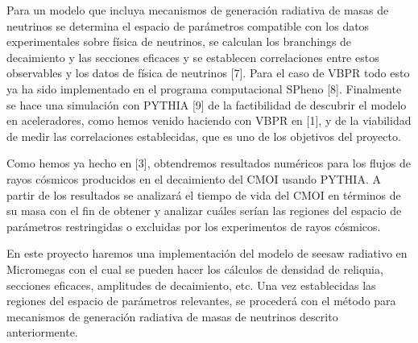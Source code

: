 \begin{ideas}
  

Para un modelo que incluya mecanismos de generación radiativa de masas de neutrinos se determina el espacio de parámetros compatible con los datos experimentales sobre física de neutrinos, se calculan los branchings de decaimiento y las secciones eficaces y se establecen correlaciones entre estos observables y los datos de física de neutrinos [7]. Para el caso de VBPR todo esto ya ha sido implementado en el programa computacional SPheno [8]. Finalmente se hace una simulación con PYTHIA [9] de la factibilidad de descubrir el modelo en aceleradores, como hemos venido haciendo con VBPR en [1], y de la viabilidad de medir las correlaciones establecidas, que es uno de los objetivos del proyecto.

Como hemos ya hecho en [3], obtendremos resultados numéricos para los flujos de rayos cósmicos  producidos en el decaimiento del CMOI usando PYTHIA. A partir de los resultados se analizará el tiempo de vida del CMOI  en términos de su masa con el fin de obtener y analizar cuáles serían las regiones del espacio de parámetros restringidas o excluidas por los experimentos de rayos cósmicos.

En este proyecto haremos una implementación del modelo de seesaw radiativo en Micromegas  con el cual se pueden hacer los cálculos de densidad de reliquia, secciones eficaces, amplitudes de decaimiento, etc. Una vez establecidas las regiones del espacio de parámetros relevantes, se procederá con el método para mecanismos de generación radiativa de masas de neutrinos descrito anteriormente.
\end{ideas}

